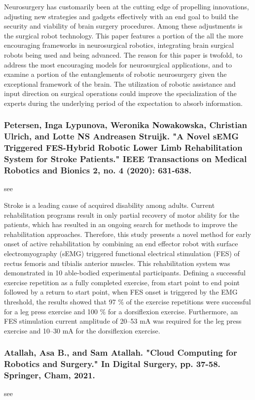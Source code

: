 \documentclass[conference]{IEEEtran}
\begin{document}
Neurosurgery has customarily been at the cutting edge of propelling innovations, adjusting new strategies and gadgets effectively with an end goal to build the security and viability of brain surgery procedures. Among these adjustments is the surgical robot technology. This paper features a portion of the all the more encouraging frameworks in neurosurgical robotics, integrating brain surgical robots being used and being advanced. The reason for this paper is twofold, to address the most encouraging models for neurosurgical applications, and to examine a portion of the entanglements of robotic neurosurgery given the exceptional framework of the brain. The utilization of robotic assistance and input direction on surgical operations could improve the specialization of the experts during the underlying period of the expectation to absorb information.

\medskip
\subsubsection{Petersen, Inga Lypunova, Weronika Nowakowska, Christian Ulrich, and Lotte NS Andreasen Struijk. "A Novel sEMG Triggered FES-Hybrid Robotic Lower Limb Rehabilitation System for Stroke Patients." IEEE Transactions on Medical Robotics and Bionics 2, no. 4 (2020): 631-638.} see \cite{petersen2020novel}

Stroke is a leading cause of acquired disability among adults. Current rehabilitation programs result in only partial recovery of motor ability for the patients, which has resulted in an ongoing search for methods to improve the rehabilitation approaches. Therefore, this study presents a novel method for early onset of active rehabilitation by combining an end effector robot with surface electromyography (sEMG) triggered functional electrical stimulation (FES) of rectus femoris and tibialis anterior muscles. This rehabilitation system was demonstrated in 10 able-bodied experimental participants. Defining a successful exercise repetition as a fully completed exercise, from start point to end point followed by a return to start point, when FES onset is triggered by the EMG threshold, the results showed that 97 \% of the exercise repetitions were successful for a leg press exercise and 100 \% for a dorsiflexion exercise. Furthermore, an FES stimulation current amplitude of 20–53 mA was required for the leg press exercise and 10–30 mA for the dorsiflexion exercise. 

\medskip
\subsubsection{Atallah, Asa B., and Sam Atallah. "Cloud Computing for Robotics and Surgery." In Digital Surgery, pp. 37-58. Springer, Cham, 2021.}
see \cite{atallah2021cloud}
\end{document}
